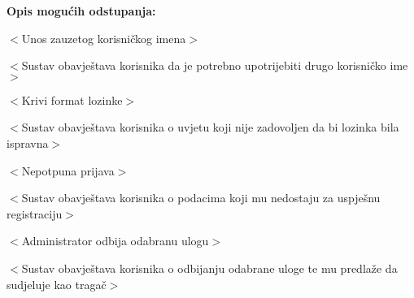 					\item  \textbf{Opis mogućih odstupanja:}
					
					\item[] \begin{packed_item}
						
						\item[3.a] $<$Unos zauzetog korisničkog imena$>$
						\item[] \begin{packed_enum}
							
							\item $<$Sustav obavještava korisnika da je potrebno upotrijebiti drugo korisničko ime$>$
	
						\end{packed_enum}

						\item[3.b] $<$Krivi format lozinke$>$\begin{packed_enum}
							
							\item $<$Sustav obavještava korisnika o uvjetu koji nije zadovoljen da bi lozinka bila ispravna$>$
							
						\end{packed_enum}
						
						\item[3.c] $<$Nepotpuna prijava$>$\begin{packed_enum}
							
							\item $<$Sustav obavještava korisnika o podacima koji mu nedostaju za uspješnu registraciju$>$
							
						\end{packed_enum}
						
						\item[4.a] $<$Administrator odbija odabranu ulogu$>$\begin{packed_enum}
							
							\item $<$Sustav obavještava korisnika o odbijanju odabrane uloge te mu predlaže da sudjeluje kao tragač$>$
							
						\end{packed_enum}
						
					\end{packed_item}
					
